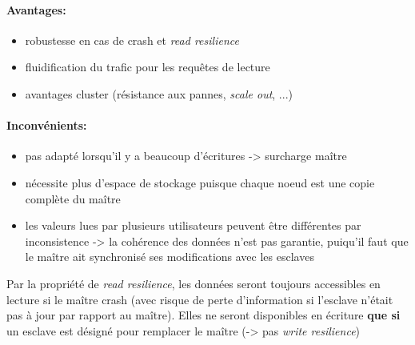 {\paragraph{Avantages:}
\begin{itemize}\setlength{\itemsep}{.2em}
\item[\textcolor{dkgreen}{\ding{52}}]robustesse en cas de crash et \textit{read resilience}
\item[\textcolor{dkgreen}{\ding{52}}]fluidification du trafic pour les requêtes de lecture
\item[\textcolor{dkgreen}{\ding{52}}]avantages cluster (résistance aux pannes, \textit{scale out}, ...)
\end{itemize}

\paragraph{Inconvénients:}
\begin{itemize}\setlength{\itemsep}{.2em}
\item[\textcolor{dkred}{\ding{56}}]pas adapté lorsqu'il y a beaucoup d'écritures -> surcharge maître
\item[\textcolor{dkred}{\ding{56}}]nécessite plus d'espace de stockage puisque chaque noeud est une copie complète du maître
\item[\textcolor{dkred}{\ding{56}}]les valeurs lues par plusieurs utilisateurs peuvent être différentes par inconsistence -> la cohérence des données n'est pas garantie, puiqu'il faut que le maître ait synchronisé ses modifications avec les esclaves
\end{itemize}
}


\item{}
{\faux}
{Par la propriété de \textit{read resilience}, les données seront toujours accessibles en lecture si le maître crash (avec risque de perte d'information si l'esclave n'était pas à jour par rapport au maître). Elles ne seront disponibles en écriture \textbf{que si} un esclave est désigné pour remplacer le maître (-> pas \textit{write resilience})}


